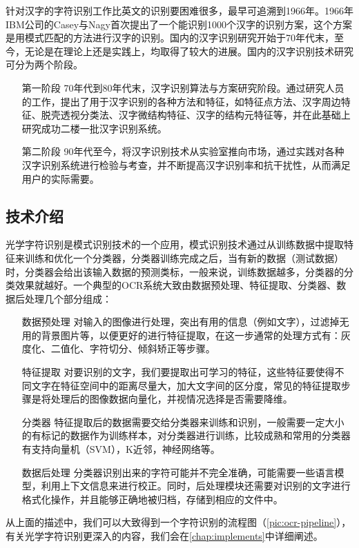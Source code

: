 针对汉字的字符识别工作比英文的识别要困难很多，最早可追溯到1966年。1966年IBM公司的Casey与Nagy首次提出了一个能识别1000个汉字的识别方案，这个方案是用模式匹配的方法进行汉字的识别。国内的汉字识别研究开始于70年代末\citep{trier1996feature}，至今，无论是在理论上还是实践上，均取得了较大的进展。国内的汉字识别技术研究可分为两个阶段\citep{FanxiaGuo,LongDing}。
\begin{itemize}
	\item[第一阶段] 70年代到80年代末，汉字识别算法与方案研究阶段。通过研究人员的工作，提出了用于汉字识别的各种方法和特征，如特征点方法、汉字周边特征、脱壳透视分类法、汉字微结构特征、汉字的结构元特征等，并在此基础上研究成功二楼一批汉字识别系统。
	\item[第二阶段] 90年代至今，将汉字识别技术从实验室推向市场，通过实践对各种汉字识别系统进行检验与考查，并不断提高汉字识别率和抗干扰性，从而满足用户的实际需要。
\end{itemize}

\subsection{技术介绍}
光学字符识别是模式识别技术的一个应用，模式识别技术通过从训练数据中提取特征来训练和优化一个分类器，分类器训练完成之后，当有新的数据（测试数据）时，分类器会给出该输入数据的预测类标，一般来说，训练数据越多，分类器的分类效果就越好。一个典型的OCR系统大致由数据预处理、特征提取、分类器、数据后处理几个部分组成：
\begin{itemize}
	\item[数据预处理] 对输入的图像进行处理，突出有用的信息（例如文字），过滤掉无用的背景图片等，以便更好的进行特征提取，在这一步通常的处理方式有：灰度化、二值化、字符切分、倾斜矫正等步骤。
	\item[特征提取] 对要识别的文字，我们要提取出可学习的特征，这些特征要使得不同文字在特征空间中的距离尽量大，加大文字间的区分度，常见的特征提取步骤是将处理后的图像数据向量化，并视情况选择是否需要降维。
	\item[分类器] 特征提取后的数据需要交给分类器来训练和识别，一般需要一定大小的有标记的数据作为训练样本，对分类器进行训练，比较成熟和常用的分类器有支持向量机（SVM），K近邻，神经网络等。
	\item[数据后处理] 分类器识别出来的字符可能并不完全准确，可能需要一些语言模型，利用上下文信息来进行校正。同时，后处理模块还需要对识别的文字进行格式化操作，并且能够正确地被归档，存储到相应的文件中。
\end{itemize}
从上面的描述中，我们可以大致得到一个字符识别的流程图（\autoref{pic:ocr-pipeline}），有关光学字符识别更深入的内容，我们会在\autoref{chap:implements}中详细阐述。

